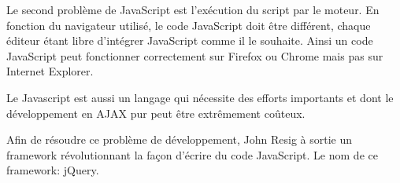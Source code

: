 Le second problème de JavaScript est l'exécution du script par le moteur. En fonction du navigateur utilisé, le code JavaScript doit être différent, chaque éditeur étant libre d’intégrer JavaScript comme il le souhaite. Ainsi un code JavaScript peut fonctionner correctement sur Firefox ou Chrome mais pas sur Internet Explorer.

Le Javascript est aussi un langage qui nécessite des efforts importants et dont le développement en AJAX pur peut être extrêmement coûteux.

Afin de résoudre ce problème de développement, John Resig à sortie un framework révolutionnant la façon d’écrire du code JavaScript. Le nom de ce framework: jQuery.


